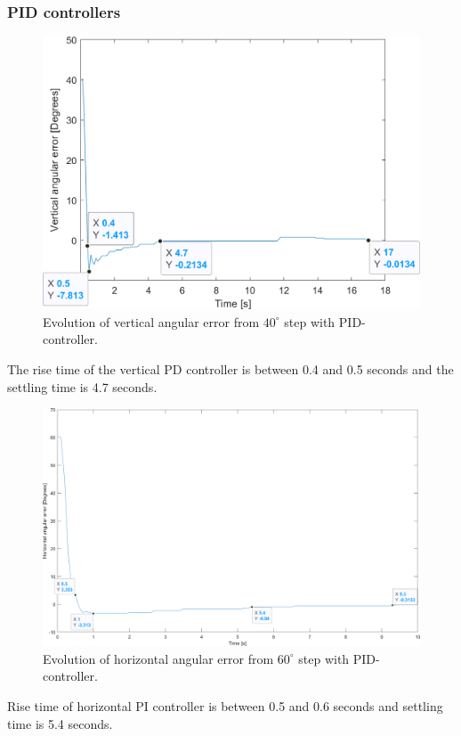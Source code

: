 \subsubsection{PID controllers}
\label{sec:simon15}
\begin{figure}[h]
\centering
\includegraphics[width=\linewidth]{sections/assets/Vertical_PID_controller.png}
\caption{Evolution of vertical angular error from \(40^{\circ}\) step with PID-controller.}
\label{vert_PID}
\end{figure}
The rise time of the vertical PD controller is between 0.4 and 0.5 seconds and the settling time is 4.7 seconds.
\begin{figure}[h]
\centering
\includegraphics[width=\linewidth]{sections/assets/Horizontal_PID_controller.png}
\caption{Evolution of horizontal angular error from \(60^{\circ}\) step with PID-controller.}
\label{Horizontal_PID}
\end{figure}
Rise time of horizontal PI controller is between 0.5 and 0.6 seconds and settling time is 5.4 seconds.

